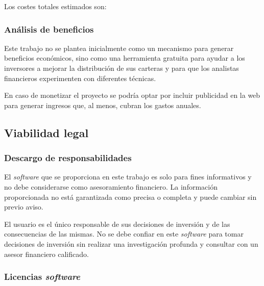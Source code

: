Los costes totales estimados son:


\subsubsection{Análisis de beneficios}

Este trabajo no se plantea inicialmente como un mecanismo para generar beneficios económicos, sino como una herramienta gratuita para ayudar a los inversores a mejorar la distribución de sus carteras y para que los analistas financieros experimenten con diferentes técnicas. 

En caso de monetizar el proyecto se podría optar por incluir publicidad en la web para generar ingresos que, al menos, cubran los gastos anuales. 

\subsection{Viabilidad legal}

\subsubsection{Descargo de responsabilidades}

El \emph{software} que se proporciona en este trabajo es solo para fines informativos y no debe considerarse como asesoramiento financiero. La información proporcionada no está garantizada como precisa o completa y puede cambiar sin previo aviso.

El usuario es el único responsable de sus decisiones de inversión y de las consecuencias de las mismas. No se debe confiar en este \emph{software} para tomar decisiones de inversión sin realizar una investigación profunda y consultar con un asesor financiero calificado.

\subsubsection{Licencias \emph{software}}

